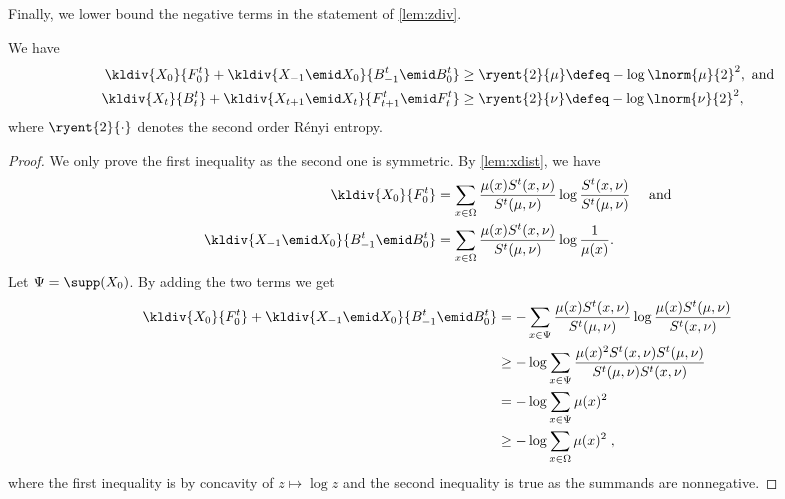 Finally, we lower bound the negative terms in the statement
of \autoref{lem:zdiv}.
\begin{lemma}
\label{lem:negterms}
We have
\begin{align}
\kldiv{X_0}{F^t_0}
    + \kldiv{X_{-1}\emid X_{0}}{B^t_{-1}\emid B^t_0}
    &\ge \ryent{2}{\mu} \defeq -\log \lnorm{\mu}{2}^2,
        \text{ and} \label{teq:negterm1}\\
\kldiv{X_t}{B^t_t}
    + \kldiv{X_{t+1}\emid X_{t}}{F^t_{t+1}\emid F^t_t}
    &\ge \ryent{2}{\nu} \defeq -\log \lnorm{\nu}{2}^2,
        \label{teq:negterm2}
\end{align}
where $\ryent{2}{\cdot}$ denotes the 
second order Rényi entropy. 
\end{lemma}
\begin{proof}
We only prove the first inequality as the
second one is symmetric. By \autoref{lem:xdist},
we have
\begin{align*}
\kldiv{X_0}{F^t_0} &= 
  \sum_{x\in \Omega}
      \frac{\mu(x)S^{t}(x,\nu)}{S^t(\mu,\nu)}
      \log \frac{S^{t}(x,\nu)}{S^t(\mu,\nu)}
          \quad\text{ and}\\
\kldiv{X_{-1}\emid X_{0}}{B^t_{-1}\emid B^t_0} &=
  \sum_{x\in \Omega}
      \frac{\mu(x)S^{t}(x,\nu)}{S^t(\mu,\nu)}
      \log\frac{1}{\mu(x)}.
\end{align*}
Let $\Psi=\supp(X_0)$. By adding the two terms we get
\begin{align}
\kldiv{X_0}{F^t_0}+
\kldiv{X_{-1}\emid X_{0}}{B^t_{-1}\emid B^t_0} &=
  -\sum_{x\in\Psi}
      \frac{\mu(x)S^{t}(x,\nu)}{S^t(\mu,\nu)}
      \log\frac{\mu(x)S^t(\mu,\nu)}{S^{t}(x,\nu)}
          \nonumber\\
  &\ge -\log \sum_{x\in\Psi}\frac%
    {\mu(x)^2 S^{t}(x,\nu)S^t(\mu,\nu)}
      {S^t(\mu,\nu)S^{t}(x,\nu)}
          \label{eq:norm-u-jens}\\
  &=   -\log \sum_{x\in\Psi} \mu(x)^2
      \nonumber\\
  &\ge -\log \sum_{x\in\Omega} \mu(x)^2\;,
      \label{eq:psivsomega}
\end{align}
where the first inequality is by concavity of 
$z\mapsto\log z$
and the second inequality is true as the 
summands are nonnegative.
\end{proof}

